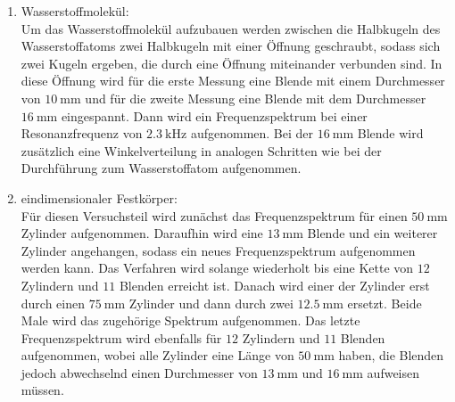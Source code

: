 \begin{enumerate}
        \newpage
    \item Wasserstoffmolekül:\\
        Um das Wasserstoffmolekül aufzubauen werden zwischen die Halbkugeln des 
        Wasserstoffatoms zwei Halbkugeln mit einer Öffnung geschraubt, sodass sich 
        zwei Kugeln ergeben, die durch eine Öffnung miteinander verbunden sind.
        In diese Öffnung wird für die erste Messung eine Blende mit einem 
        Durchmesser von $\SI{10}{\milli\meter}$ und für die zweite Messung eine 
        Blende mit dem Durchmesser $\SI{16}{\milli\meter}$ eingespannt.
        Dann wird ein Frequenzspektrum bei einer Resonanzfrequenz von 
        $\SI{2,3}{\kilo\hertz}$ aufgenommen. 
        Bei der $\SI{16}{\milli\meter}$ Blende wird zusätzlich eine
        Winkelverteilung in analogen Schritten wie bei der Durchführung
        zum Wasserstoffatom aufgenommen.
    \item eindimensionaler Festkörper:\\
        Für diesen Versuchsteil wird zunächst das Frequenzspektrum für einen 
        $\SI{50}{\milli\meter}$ Zylinder aufgenommen. Daraufhin wird eine 
        $\SI{13}{\milli\meter}$ Blende und ein weiterer Zylinder angehangen, sodass 
        ein neues Frequenzspektrum aufgenommen werden kann. Das Verfahren wird 
        solange wiederholt bis eine Kette von $\num{12}$ Zylindern und $\num{11}$
        Blenden erreicht ist. Danach wird einer der Zylinder erst durch einen 
        $\SI{75}{\milli\meter}$ Zylinder und dann durch zwei $\SI{12,5}{\milli\meter}$
        ersetzt. Beide Male wird das zugehörige Spektrum aufgenommen.
        Das letzte Frequenzspektrum wird ebenfalls für $\num{12}$ Zylindern und $\num{11}$
        Blenden aufgenommen, wobei alle Zylinder eine Länge von $\SI{50}{\milli\meter}$
        haben, die Blenden jedoch abwechselnd einen Durchmesser von
        $\SI{13}{\milli\meter}$ und $\SI{16}{\milli\meter}$ aufweisen müssen.
\end{enumerate}
\newpage
